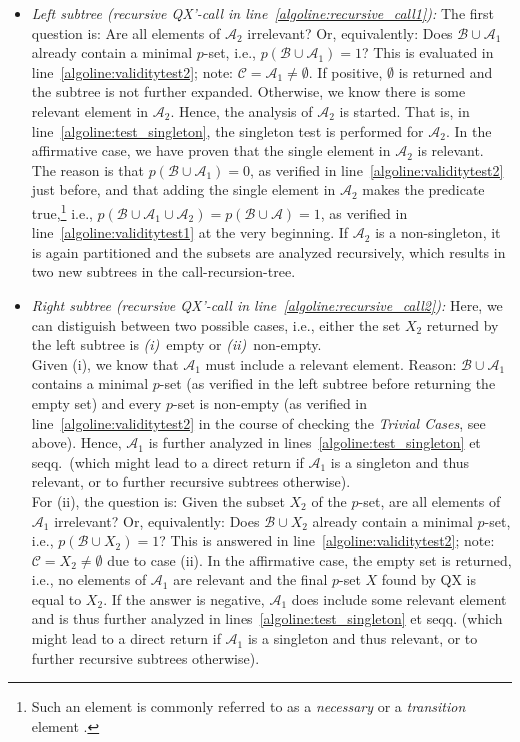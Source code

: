 \documentclass[]{elsarticle}
\newcommand{\ma}{\mathcal{A}}
\newcommand{\mb}{\mathcal{B}}
\newcommand{\mc}{\mathcal{C}}
\begin{document}
	\begin{itemize}[leftmargin=*]
		\item \emph{Left subtree (recursive QX'-call in line~\ref{algoline:recursive_call1}):} The first question is: Are all elements of $\ma_2$ irrelevant? Or, equivalently: Does $\mb \cup \ma_1$ already contain a minimal $p$-set, i.e., $p(\mb\cup\ma_1)=1$? This is evaluated in line~\ref{algoline:validitytest2}; note: $\mc = \ma_1 \neq \emptyset$. If positive, 
		$\emptyset$ is returned and the subtree is not further expanded. Otherwise, we know there is some relevant element in $\ma_2$. Hence, the analysis of $\ma_2$ is started. That is, in line~\ref{algoline:test_singleton}, the singleton test is performed for $\ma_2$. In the affirmative case, we have proven that the single element in $\ma_2$ is 
		relevant.
		The reason is that $p(\mb \cup \ma_1) = 0$, as verified in line~\ref{algoline:validitytest2} just before, and that adding the single element in $\ma_2$ makes the predicate true,\footnote{Such an element is commonly referred to as a \emph{necessary} or a \emph{transition} element \cite{belov2012muser2}.} i.e., $p(\mb\cup\ma_1\cup\ma_2) = p(\mb\cup\ma) = 1$, as verified in line~\ref{algoline:validitytest1} at the very beginning. If $\ma_2$ is a non-singleton, it is again partitioned and the subsets are analyzed recursively, which results in two new 
		subtrees in the call-recursion-tree.
		\item \emph{Right subtree (recursive QX'-call in line~\ref{algoline:recursive_call2}):} Here, we can distiguish between two possible cases, i.e., either the 
		set $X_2$ returned by the left subtree is \emph{(i)}~empty or \emph{(ii)}~non-empty. 
		\\Given (i), we know that $\ma_1$ must include a relevant element. Reason: $\mb\cup\ma_1$ contains a minimal $p$-set (as verified in the left subtree before returning the empty set) and every $p$-set is non-empty (as verified in line~\ref{algoline:validitytest2} in the course of checking the \emph{Trivial Cases}, see above). Hence, $\ma_1$ is further analyzed in lines~\ref{algoline:test_singleton} et seqq.\ (which might lead to a direct return if $\ma_1$ is a singleton and thus relevant, or to further recursive subtrees otherwise).
		\\For (ii), the question is: Given the subset $X_2$ of the $p$-set, are all elements of $\ma_1$ irrelevant? Or, equivalently: Does $\mb \cup X_2$ already contain a minimal $p$-set, i.e., $p(\mb \cup X_2)=1$? This is answered in line~\ref{algoline:validitytest2}; note: $\mc = X_2 \neq \emptyset$ due to case (ii). In the affirmative case, the empty set is returned, i.e., no elements of $\ma_1$ are relevant and the final $p$-set $X$ found by QX is equal to $X_2$. If the answer is negative, $\ma_1$ does include some relevant element and is thus further analyzed in lines~\ref{algoline:test_singleton} et seqq. (which might lead to a direct return if $\ma_1$ is a singleton and thus relevant, or to further recursive subtrees otherwise).  
	\end{itemize} 
\end{document}
